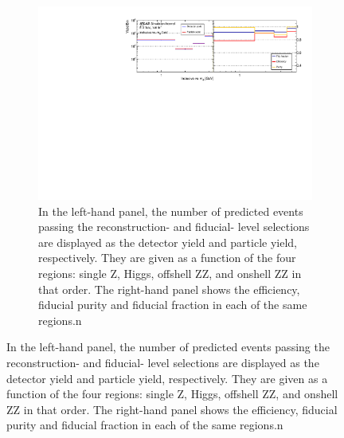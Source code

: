 \begin{figure}[htb!]
    \begin{subfigure}{.99\textwidth}\centering
      \includegraphics[width=.99\linewidth]{Figures/m4l/UnfoldingStudies/v014_inputs/inclusive_vs_m4linputs.pdf}  
      \caption{In the left-hand panel, the number of predicted events passing the reconstruction- and fiducial- level selections are displayed as the detector yield and particle yield, respectively. They are given as a function of the four \mFourL regions: single Z, Higgs,  offshell ZZ, and onshell ZZ in that order. The right-hand panel shows the efficiency, fiducial purity and fiducial fraction in each of the same \mFourL regions.n}
      \label{fig:inclvm4lunf}
    \end{subfigure}
\end{figure}

